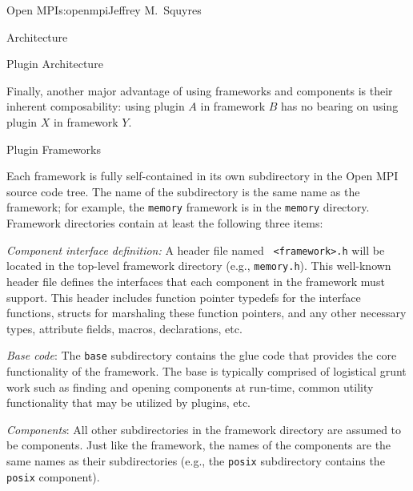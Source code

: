 \begin{aosachapter}{Open MPI}{s:openmpi}{Jeffrey M.\ Squyres}
\begin{aosasect1}{Architecture}
\begin{aosasect2}{Plugin Architecture}

Finally, another major advantage of using frameworks and components is
their inherent composability: using plugin $A$ in framework $B$ has no
bearing on using plugin $X$ in framework $Y$.

\end{aosasect2}


\begin{aosasect2}{Plugin Frameworks}

Each framework is fully self-contained in its own subdirectory in the
Open MPI source code tree.  The name of the subdirectory is the same
name as the framework; for example, the {\tt memory} framework is in
the {\tt memory} directory.  
%
Framework directories contain at least the following three items:

\begin{aosaenumerate}
\item {\em Component interface definition:} A header file named {\tt
    <framework>.h} will be located in the top-level framework
  directory (e.g., {\tt memory.h}).  This well-known header file
  defines the interfaces that each component in the framework must
  support.  This header includes function pointer typedefs for the
  interface functions, structs for marshaling these function pointers,
  and any other necessary types, attribute fields, macros,
  declarations, etc.

\item {\em Base code}: The {\tt base} subdirectory contains the glue
  code that provides the core functionality of the framework.  The
  base is typically comprised of logistical grunt work such as finding
  and opening components at run-time, common utility functionality
  that may be utilized by plugins, etc.

\item {\em Components}: All other subdirectories in the framework
  directory are assumed to be components.  Just like the framework,
  the names of the components are the same names as their
  subdirectories (e.g., the {\tt posix} subdirectory contains the {\tt
    posix} component).
\end{aosaenumerate}


\end{aosasect2}
\end{aosasect1}
\end{aosachapter}
